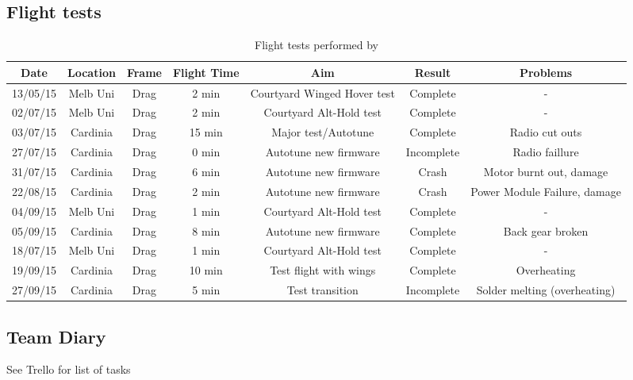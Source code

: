 \subsection{Flight tests}
\label{sec:diary}
\begin{table}[htbp]
	\centering
	\caption{Flight tests performed by \ID}
	\begin{tabular}{|c|c|c|c|c|c|c|}
		\hline Date & Location & Frame & Flight Time & Aim & Result & Problems \\ 
		\hline 13/05/15 & Melb Uni & Drag & 2 min & Courtyard Winged Hover test & Complete & - \\ 
		\hline 02/07/15 & Melb Uni & Drag & 2 min & Courtyard Alt-Hold test & Complete & - \\ 
		\hline 03/07/15 & Cardinia & Drag & 15 min & Major test/Autotune & Complete & Radio cut outs \\ 
		\hline 27/07/15 & Cardinia  & Drag & 0 min & Autotune new firmware & Incomplete & Radio faillure \\ 
		\hline 31/07/15 & Cardinia  & Drag & 6 min & Autotune new firmware & Crash & Motor burnt out, damage  \\ 
		\hline 22/08/15 & Cardinia  & Drag & 2 min & Autotune new firmware & Crash & Power Module Failure, damage\\
		\hline 04/09/15 & Melb Uni & Drag & 1 min & Courtyard Alt-Hold test & Complete & - \\  
		\hline 05/09/15 & Cardinia  & Drag & 8 min & Autotune new firmware & Complete & Back gear broken\\
		\hline 18/07/15 & Melb Uni & Drag & 1 min & Courtyard Alt-Hold test & Complete & - \\  
		\hline 19/09/15 & Cardinia  & Drag & 10 min & Test flight with wings & Complete & Overheating \\ 
		\hline 27/09/15 & Cardinia  & Drag & 5 min & Test transition & Incomplete & Solder melting (overheating) \\ 
		\hline 
	\end{tabular} 
	\label{tab:tests}
\end{table}

\subsection{Team Diary}
See Trello for list of tasks



